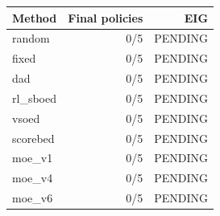 \begin{tabular}{lrr}
Method & Final policies & EIG \\
\hline
random & 0/5 & PENDING \\
fixed & 0/5 & PENDING \\
dad & 0/5 & PENDING \\
rl\_sboed & 0/5 & PENDING \\
vsoed & 0/5 & PENDING \\
scorebed & 0/5 & PENDING \\
moe\_v1 & 0/5 & PENDING \\
moe\_v4 & 0/5 & PENDING \\
moe\_v6 & 0/5 & PENDING \\
\end{tabular}